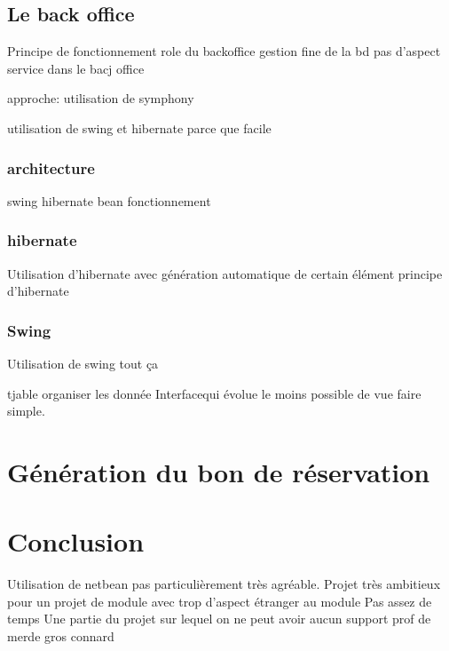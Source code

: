 \documentclass[11pt,a4paper]{article}
\begin{document}
\subsection{Le back office}

Principe de fonctionnement role du backoffice
gestion fine de la bd
pas d'aspect service dans le bacj office

approche: utilisation de symphony

utilisation de swing et hibernate parce que facile

\subsubsection{architecture}

swing hibernate
bean 
fonctionnement

\subsubsection{hibernate}
Utilisation d'hibernate avec génération automatique de certain élément 
principe d'hibernate

\subsubsection{Swing}
Utilisation de swing tout ça

tjable organiser les donnée
Interfacequi évolue
le moins possible de vue
faire simple.

\section{Génération du bon de réservation}

\section{Conclusion}

Utilisation de netbean pas particulièrement très agréable. 
Projet très ambitieux pour un projet de module avec trop d'aspect étranger au module 
Pas assez de temps
Une partie du projet sur lequel on ne peut avoir aucun support
prof de merde
gros connard
\end{document}
